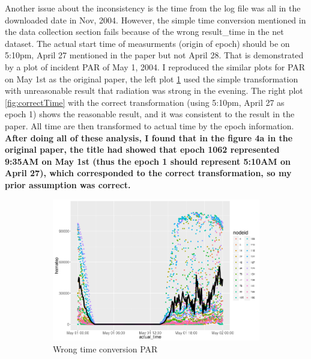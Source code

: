 \documentclass[11pt]{article}
\begin{document}
{Another issue about the inconsistency is the time from the log file was all in the downloaded date in Nov, 2004. However, the simple time conversion mentioned in the data collection section fails because of the wrong result\_time in the net dataset. The actual start time of measurments (origin of epoch) should be on 5:10pm, April 27 mentioned in the paper but not April 28. That is demonstrated by a plot of incident PAR of May 1, 2004. I reproduced the similar plots for PAR on May 1st as the original paper, the left plot \ref{fig:wrongTime} used the simple transformation with unreasonable result that radiation was strong in the evening. The right plot \ref{fig:correctTime} with the correct transformation (using 5:10pm, April 27 as epoch 1) shows the reasonable result, and it was consistent to the result in the paper. All time are then transformed to actual time by the epoch information. \\
\textbf{After doing all of these analysis, I found that in the figure 4a in the original paper, the title had showed that epoch 1062 represented 9:35AM on May 1st (thus the epoch 1 should represent 5:10AM on April 27), which corresponded to the correct transformation, so my prior assumption was correct.}\\
\begin{figure}[H]
\centering
\begin{subfigure}{.5\textwidth}
\centering
\includegraphics[width=0.95\linewidth]{wrong_time_conversion.png}
\caption{Wrong time conversion PAR}
\label{fig:wrongTime}
\end{subfigure}%
\begin{subfigure}{.5\textwidth}
\centering

\end{subfigure}
\end{figure}}
\end{document}
